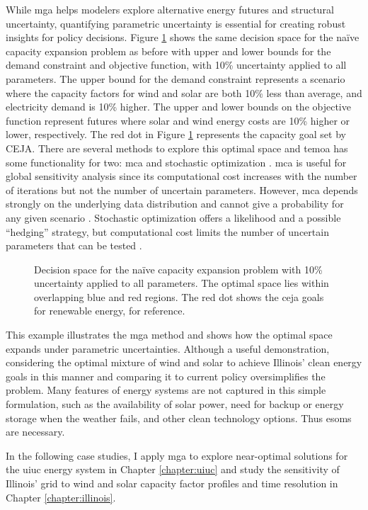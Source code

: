 While \gls{mga} helps modelers explore alternative energy futures and structural
uncertainty, quantifying parametric uncertainty is essential for creating robust insights
for policy decisions. Figure \ref{fig:param-fig} shows the same decision space for
the na\"{i}ve capacity expansion problem as before with upper and lower bounds for
the demand constraint and objective function, with 10\% uncertainty applied to all
parameters. The upper bound for the demand constraint represents a scenario where
the capacity factors for wind and solar are both 10\% less than average, and electricity
demand is 10\% higher. The upper and lower bounds on the objective function represent
futures where solar and wind energy costs are 10\% higher or lower, respectively. The
red dot in Figure \ref{fig:param-fig} represents the
capacity goal set by CEJA. There are several methods to explore this optimal space and
\gls{temoa} has some functionality for two: \gls{mca} \cite{yue_review_2018} and
stochastic optimization \cite{decarolis_multi-stage_2012, bennett_extending_2021}.
\gls{mca} is useful for global sensitivity analysis since its computational
cost increases with the number of iterations but not the number of uncertain
parameters. However, \gls{mca} depends strongly on the underlying data distribution
and cannot give a probability for any given scenario \cite{yue_review_2018}.
Stochastic optimization offers a likelihood and a possible ``hedging'' strategy,
but computational cost limits the number of uncertain parameters that can be
tested \cite{yue_review_2018}.

\begin{figure}[H]
  \centering
  \resizebox{0.8\columnwidth}{!}{}
  \caption{Decision space for the na\"{i}ve capacity expansion problem with
  10\% uncertainty applied to all parameters. The optimal space lies within
  overlapping blue and red regions. The red dot shows the \gls{ceja} goals for
  renewable energy, for reference.}
  \label{fig:param-fig}
\end{figure}

This example illustrates the \gls{mga} method and shows how the optimal space
expands under parametric uncertainties.
Although a useful demonstration, considering the optimal mixture of wind and solar
to achieve Illinois' clean energy goals in this manner and comparing it to
current policy oversimplifies the problem.
Many features of energy systems are not captured in this simple formulation,
such as the availability of solar power, need for backup or energy storage when
the weather fails, and other clean technology options. Thus \glspl{esom} are necessary.

In the following case studies, I apply \gls{mga} to explore near-optimal solutions
for the \gls{uiuc} energy system in Chapter \ref{chapter:uiuc} and study the
sensitivity of Illinois' grid to wind and solar capacity factor profiles and time
resolution in Chapter \ref{chapter:illinois}.
